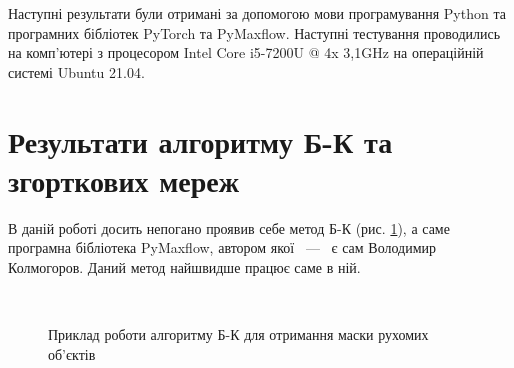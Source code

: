 Наступні результати були отримані за допомогою мови програмування Python та
програмних бібліотек PyTorch та PyMaxflow. Наступні тестування проводились на комп'ютері з
процесором Intel Core i5-7200U @ 4x 3,1GHz на операційній системі Ubuntu 21.04.

\section{Результати алгоритму Б-К та згорткових мереж}

В даній роботі досить непогано проявив себе метод Б-К (рис. \ref{fig:bk_examples}),
а саме програмна бібліотека PyMaxflow, автором якої ~---~ є сам Володимир Колмогоров.
Даний метод найшвидше працює саме в ній.

\begin{figure}[H]
    \centering

    \\
    \caption{Приклад роботи алгоритму Б-К для отримання маски рухомих об'єктів
        \label{fig:bk_examples}
    }
\end{figure}

